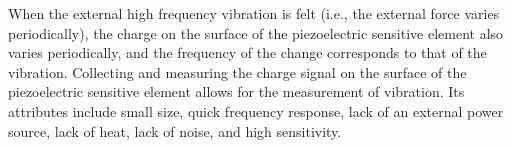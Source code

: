 When the external high frequency vibration is felt (i.e., the external force varies periodically), 
the charge on the surface of the piezoelectric sensitive element also varies periodically, 
and the frequency of the change corresponds to that of the vibration. Collecting and measuring the charge signal 
on the surface of the piezoelectric sensitive element allows for the measurement of vibration. 
Its attributes include small size, quick frequency response, lack of an external power source, lack of heat, 
lack of noise, and high sensitivity.







